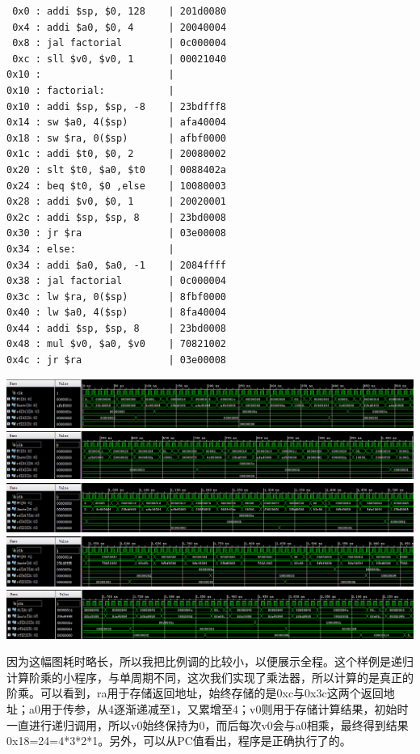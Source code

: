 \documentclass[12pt]{article} %
\begin{document}
\begin{sloppypar}
\begin{lstlisting}
 0x0 : addi $sp, $0, 128    | 201d0080
 0x4 : addi $a0, $0, 4      | 20040004
 0x8 : jal factorial        | 0c000004
 0xc : sll $v0, $v0, 1      | 00021040
0x10 :                      | 
0x10 : factorial:           | 
0x10 : addi $sp, $sp, -8    | 23bdfff8
0x14 : sw $a0, 4($sp)       | afa40004
0x18 : sw $ra, 0($sp)       | afbf0000
0x1c : addi $t0, $0, 2      | 20080002
0x20 : slt $t0, $a0, $t0    | 0088402a
0x24 : beq $t0, $0 ,else    | 10080003
0x28 : addi $v0, $0, 1      | 20020001
0x2c : addi $sp, $sp, 8     | 23bd0008
0x30 : jr $ra               | 03e00008
0x34 : else:                | 
0x34 : addi $a0, $a0, -1    | 2084ffff
0x38 : jal factorial        | 0c000004
0x3c : lw $ra, 0($sp)       | 8fbf0000
0x40 : lw $a0, 4($sp)       | 8fa40004
0x44 : addi $sp, $sp, 8     | 23bd0008
0x48 : mul $v0, $a0, $v0    | 70821002
0x4c : jr $ra               | 03e00008
\end{lstlisting} 
\noindent
\includegraphics[width =\linewidth]{figure/fac1.png}
\includegraphics[width =\linewidth]{figure/fac2.png}
\includegraphics[width =\linewidth]{figure/fac3.png}
\includegraphics[width =\linewidth]{figure/fac4.png}
\includegraphics[width =\linewidth]{figure/fac5.png}

因为这幅图耗时略长，所以我把比例调的比较小，以便展示全程。这个样例是递归计算阶乘的小程序，与单周期不同，这次我们实现了乘法器，所以计算的是真正的阶乘。可以看到，ra用于存储返回地址，始终存储的是0xc与0x3c这两个返回地址；a0用于传参，从4逐渐递减至1，又累增至4；v0则用于存储计算结果，初始时一直进行递归调用，所以v0始终保持为0，而后每次v0会与a0相乘，最终得到结果0x18=24=4*3*2*1。另外，可以从PC值看出，程序是正确执行了的。


\end{sloppypar}
\end{document}
